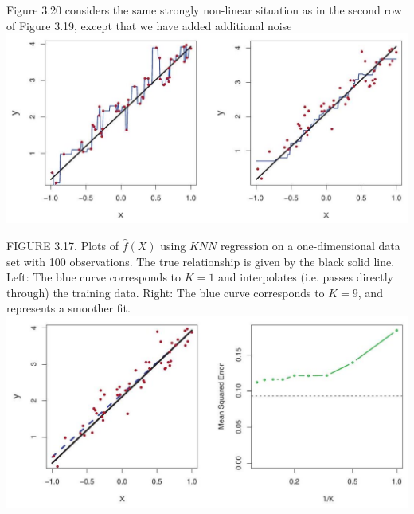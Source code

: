 \documentclass[10pt]{article}
\begin{document}
Figure 3.20 considers the same strongly non-linear situation as in the second row of Figure 3.19, except that we have added additional noise\\
\includegraphics[max width=\textwidth, center]{2025_05_05_efe77898333945044de4g-122}

FIGURE 3.17. Plots of $\hat{f}(X)$ using $K N N$ regression on a one-dimensional data set with 100 observations. The true relationship is given by the black solid line. Left: The blue curve corresponds to $K=1$ and interpolates (i.e. passes directly through) the training data. Right: The blue curve corresponds to $K=9$, and represents a smoother fit.\\
\includegraphics[max width=\textwidth, center]{2025_05_05_efe77898333945044de4g-122(1)}
\end{document}
